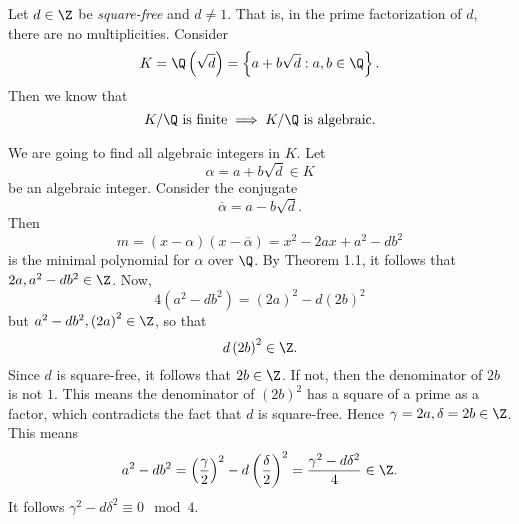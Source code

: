 \documentclass[pmath441]{subfiles}
\begin{document}
    \begin{example}{}
        Let $d\in\Z$ be \emph{square-free} and $d\neq 1$. That is, in the prime factorization of $d$, there are no multiplicities. Consider
        \begin{equation*}
            K = \Q\left( \sqrt{d} \right) = \left\lbrace a+b\sqrt{d}: a,b\in\Q \right\rbrace.
        \end{equation*}
        Then we know that
        \begin{equation*}
            K /\Q\text{ is finite}\implies K /\Q\text{ is algebraic}.
        \end{equation*}

        We are going to find all algebraic integers in $K$. Let
        \begin{equation*}
            \alpha = a+b\sqrt{d}\in K
        \end{equation*}
        be an algebraic integer. Consider the conjugate
        \begin{equation*}
            \overline{\alpha} = a-b\sqrt{d}.
        \end{equation*}
        Then
        \begin{equation*}
            m = \left( x-\alpha \right)\left( x-\overline{\alpha} \right) = x^{2}-2ax+a^{2}-db^{2}
        \end{equation*}
        is the minimal polynomial for $\alpha$ over $\Q$. By Theorem 1.1, it follows that $2a,a^{2}-db^{2}\in\Z$. Now,
        \begin{equation*}
            4\left( a^{2}-db^{2} \right) = \left( 2a \right)^{2} - d\left( 2b \right)^{2}
        \end{equation*}
        but $a^{2}-db^{2}, \left( 2a \right)^{2}\in\Z$, so that
        \begin{equation*}
            d\left( 2b \right)^{2}\in\Z.
        \end{equation*}
        Since $d$ is square-free, it follows that $2b\in\Z$. If not, then the denominator of $2b$ is not $1$. This means the denominator of $\left( 2b \right)^{2}$ has a square of a prime as a factor, which contradicts the fact that $d$ is square-free. Hence $\gamma = 2a, \delta = 2b\in\Z$. This means
        \begin{equation*}
            a^{2}-db^{2} = \left( \frac{\gamma}{2} \right)^{2} - d\left( \frac{\delta}{2} \right)^{2} = \frac{\gamma^{2}-d\delta^{2}}{4}\in\Z.
        \end{equation*}
        It follows $\gamma^{2}-d\delta^{2} \equiv 0 \mod 4$.


\end{example}
\end{document}
